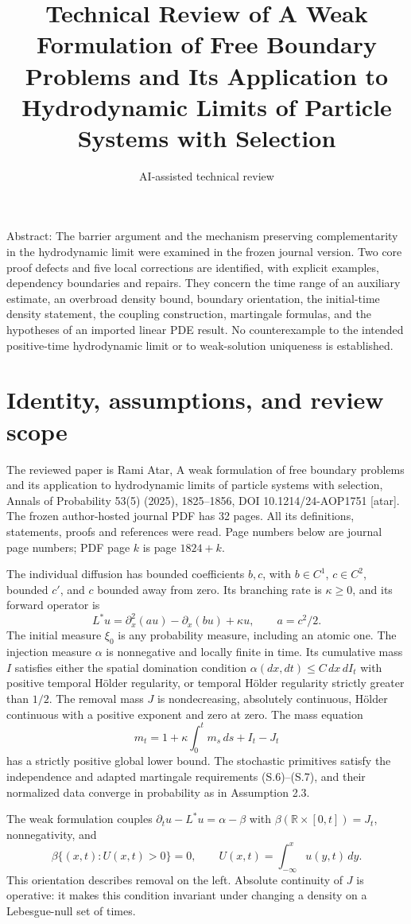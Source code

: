 \documentclass[10pt]{article}
\title{Technical Review of A Weak Formulation of Free Boundary Problems and Its Application to Hydrodynamic Limits of Particle Systems with Selection}
\author{AI-assisted technical review}
\date{}
\begin{document}
\maketitle
Abstract: The barrier argument and the mechanism preserving complementarity in the hydrodynamic limit were examined in the frozen journal version. Two core proof defects and five local corrections are identified, with explicit examples, dependency boundaries and repairs. They concern the time range of an auxiliary estimate, an overbroad density bound, boundary orientation, the initial-time density statement, the coupling construction, martingale formulas, and the hypotheses of an imported linear PDE result. No counterexample to the intended positive-time hydrodynamic limit or to weak-solution uniqueness is established.\par
\section*{Identity, assumptions, and review scope}
The reviewed paper is Rami Atar, A weak formulation of free boundary problems and its application to hydrodynamic limits of particle systems with selection, Annals of Probability 53(5) (2025), 1825–1856, DOI 10.1214/24-AOP1751 [atar]. The frozen author-hosted journal PDF has 32 pages. All its definitions, statements, proofs and references were read. Page numbers below are journal page numbers; PDF page \(k\) is page \(1824+k\).\par
The individual diffusion has bounded coefficients \(b,c\), with \(b\in C^1\), \(c\in C^2\), bounded \(c'\), and \(c\) bounded away from zero. Its branching rate is \(\kappa\geq0\), and its forward operator is \[L^*u=\partial_x^2(au)-\partial_x(bu)+\kappa u,\qquad a=c^2/2.\] The initial measure \(\xi_0\) is any probability measure, including an atomic one. The injection measure \(\alpha\) is nonnegative and locally finite in time. Its cumulative mass \(I\) satisfies either the spatial domination condition \(\alpha(dx,dt)\leq C\,dx\,dI_t\) with positive temporal Hölder regularity, or temporal Hölder regularity strictly greater than \(1/2\). The removal mass \(J\) is nondecreasing, absolutely continuous, Hölder continuous with a positive exponent and zero at zero. The mass equation \[m_t=1+\kappa\int_0^t m_s\,ds+I_t-J_t\] has a strictly positive global lower bound. The stochastic primitives satisfy the independence and adapted martingale requirements (S.6)–(S.7), and their normalized data converge in probability as in Assumption 2.3.\par
The weak formulation couples \(\partial_tu-L^*u=\alpha-\beta\) with \(\beta(\mathbb R\times[0,t])=J_t\), nonnegativity, and \[\beta\{(x,t):U(x,t)>0\}=0,\qquad
U(x,t)=\int_{-\infty}^x u(y,t)\,dy.\] This orientation describes removal on the left. Absolute continuity of \(J\) is operative: it makes this condition invariant under changing a density on a Lebesgue-null set of times.\par
\end{document}
